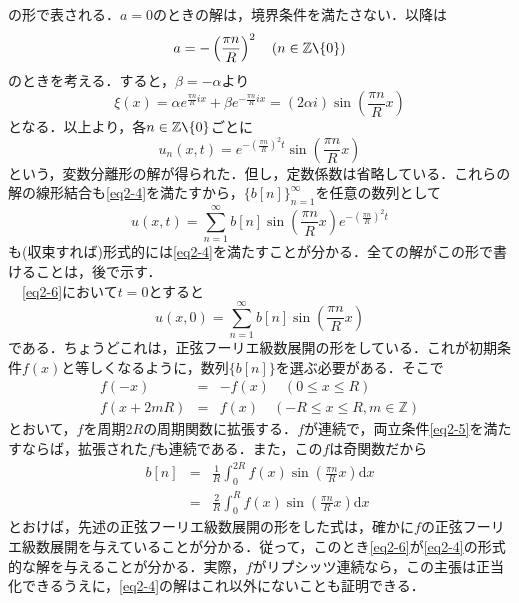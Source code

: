 \documentclass[a4j]{jsbook}
\numberwithin{theorem}{chapter}  %
\begin{document}
の形で表される．\(a=0\)のときの解は，境界条件を満たさない．以降は
\begin{equation*}
    a=-\left(\frac{\pi n}{R}\right)^2\quad (n\in\mathbb{Z}\verb|\|\{0\})
\end{equation*}
のときを考える．すると，\(\beta=-\alpha\)より
\begin{equation*}
    \xi(x)=\alpha e^{\frac{\pi n}{R}ix}+\beta e^{-\frac{\pi n}{R}ix}=(2\alpha i)\sin\left(\frac{\pi n}{R}x\right)
\end{equation*}
となる．以上より，各\(n\in\mathbb{Z}\verb|\|\{0\}\)ごとに
\begin{equation*}
    u_n(x, t)=e^{-\left(\frac{\pi n}{R}\right)^2t}\sin\left(\frac{\pi n}{R}x\right)
\end{equation*}
という，変数分離形の解が得られた．但し，定数係数は省略している．これらの解の線形結合も\eqref{eq2-4}を満たすから，\(\{b[n]\}_{n=1}^\infty\)を任意の数列として
\begin{equation}
    u(x, t)=\sum_{n=1}^\infty b[n]\sin\left(\frac{\pi n}{R}x\right)e^{-\left(\frac{\pi n}{R}\right)^2t} \label{eq2-6}
\end{equation}
も(収束すれば)形式的には\eqref{eq2-4}を満たすことが分かる．全ての解がこの形で書けることは，後で示す． \\
　\eqref{eq2-6}において\(t=0\)とすると
\begin{equation*}
    u(x, 0)=\sum_{n=1}^\infty b[n]\sin\left(\frac{\pi n}{R}x\right)
\end{equation*}
である．ちょうどこれは，正弦フーリエ級数展開の形をしている．これが初期条件\(f(x)\)と等しくなるように，数列\(\{b[n]\}\)を選ぶ必要がある．そこで
\begin{eqnarray*}
f(-x)&=&-f(x)\quad (0\leq x\leq R) \\
f(x+2mR)&=&f(x)\quad (-R\leq x\leq R, m\in\mathbb{Z})
\end{eqnarray*}
とおいて，\(f\)を周期\(2R\)の周期関数に拡張する．\(f\)が連続で，両立条件\eqref{eq2-5}を満たすならば，拡張された\(f\)も連続である．また，この\(f\)は奇関数だから
\begin{eqnarray*}
b[n]&=&\frac{1}{R}\int_0^{2R}f(x)\sin\left(\frac{\pi n}{R}x\right)\mathrm{d}x \\
&=&\frac{2}{R}\int_0^R f(x)\sin\left(\frac{\pi n}{R}x\right)\mathrm{d}x
\end{eqnarray*}
とおけば，先述の正弦フーリエ級数展開の形をした式は，確かに\(f\)の正弦フーリエ級数展開を与えていることが分かる．従って，このとき\eqref{eq2-6}が\eqref{eq2-4}の形式的な解を与えることが分かる．実際，\(f\)がリプシッツ連続なら，この主張は正当化できるうえに，\eqref{eq2-4}の解はこれ以外にないことも証明できる．
\end{document}
